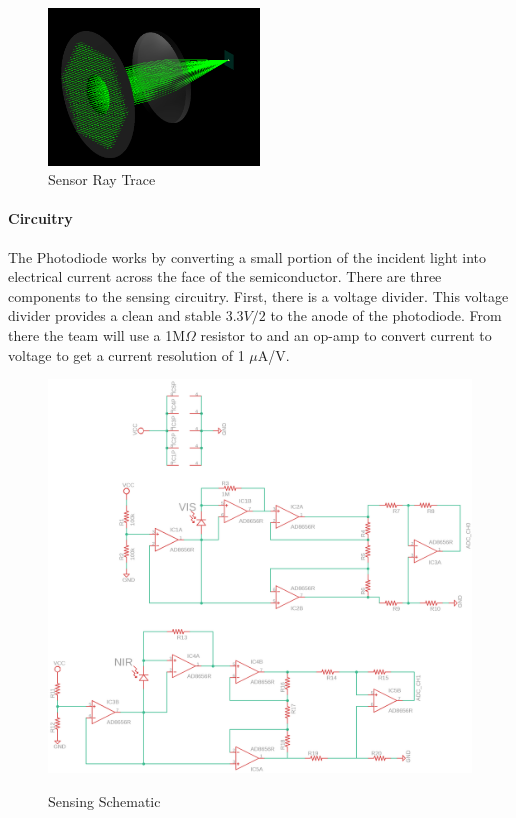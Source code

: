 \begin{figure}[H]
    \caption{Sensor Ray Trace}
    \centering
    \includegraphics[width=0.5\textwidth]{images/ColimatedBeam.png}
\end{figure}


\paragraph{Circuitry} The Photodiode works by converting a small portion of the incident light into electrical current across the face of the semiconductor. There are three components to the sensing circuitry. First, there is a voltage divider. This voltage divider provides a clean and stable $3.3V/2$ to the anode of the photodiode. From there the team will use a 1M$\Omega$ resistor to and an op-amp to convert current to voltage to get a current resolution of 1 $\mu$A/V.
\begin{figure}[H]
    \caption{Sensing Schematic}
    \centering
    \includegraphics[width=.8\textwidth]{images/sensor-schematic.png}
    \label{fig:sensor-schem}
\end{figure}

